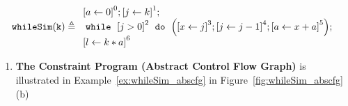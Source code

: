 \begin{example}
  \label{ex:whileSigle}
  $$
  \kw{whileSim(k)} \triangleq
    \begin{array}{l}
        \clabel{ \assign{a}{0}}^{0} ;   
              \clabel{\assign{j}{k} }^{1} ;\\
              \ewhile ~ \clabel{j > 0}^{2} ~ \edo ~ 
              \Big(
               \clabel{\assign{x}{j} }^{3}  ;
               \clabel{\assign{j}{j-1}}^{4} ;
              \clabel{\assign{a}{x + a}}^{5}  \Big);\\
              \clabel{\assign{l}{k * a} }^{6}
          \end{array}
  $$
\end{example}
  \begin{enumerate}
    \item  \textbf{The Constraint Program (Abstract Control Flow Graph)}
    is illustrated in Example~\ref{ex:whileSim_abscfg} in Figure~\ref{fig:whileSim_abscfg}(b)
  

\end{enumerate}
